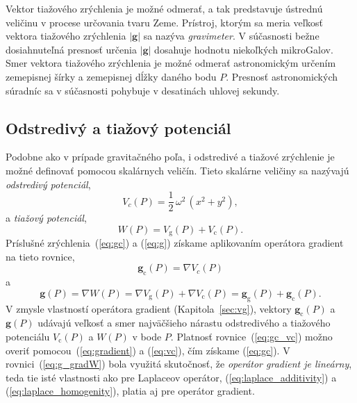 \documentclass[a4paper, 12pt]{book}
\newcommand{\gidx}{\mathrm g}
\newcommand{\cidx}{\mathrm c}
\let\vec\mathbf
\begin{document}
Vektor tiažového zrýchlenia je možné odmerať, a tak predstavuje ústrednú 
veličinu v procese určovania tvaru Zeme.  Prístroj, ktorým sa meria veľkosť 
vektora tiažového zrýchlenia $| \vec g |$ sa nazýva \emph{gravimeter}.  
V súčasnosti bežne dosiahnuteľná presnosť určenia $| \vec g |$ dosahuje hodnotu 
niekoľkých mikroGalov.  Smer vektora tiažového zrýchlenia je možné odmerať 
astronomickým určením zemepisnej šírky a zemepisnej dĺžky daného bodu $P$.  
Presnosť astronomických súradníc sa v súčasnosti pohybuje v desatinách uhlovej 
sekundy.






\subsection{Odstredivý a tiažový potenciál}

Podobne ako v prípade gravitačného poľa, i odstredivé a tiažové zrýchlenie je 
možné definovať pomocou skalárnych veličín.  Tieto skalárne veličiny sa 
nazývajú \emph{odstredivý potenciál},
%
\begin{equation}
\label{eq:vc}
V_c(P) = \frac{1}{2} \, \omega^2 \, (x^2 + y^2){,}
\end{equation}
%
a \emph{tiažový potenciál},
%
\begin{equation}
W(P) = V_\gidx(P) + V_\cidx(P){.}
\end{equation}
%
Príslušné zrýchlenia~(\ref{eq:gc}) a (\ref{eq:g}) získame aplikovaním operátora 
gradient na tieto rovnice,
%
\begin{equation}
\label{eq:gc_vc}
\vec g_\cidx(P) = \nabla V_c(P)
\end{equation}
%
a
%
\begin{equation}
\label{eq:g_gradW}
\vec g(P) = \nabla W(P) = \nabla V_\gidx(P) + \nabla V_\cidx(P) = \vec 
g_\gidx(P) + \vec g_\cidx(P){.}
\end{equation}
%
V zmysle vlastností operátora gradient (Kapitola~\ref{sec:vg}), vektory $\vec 
g_\cidx(P)$ a $\vec g(P)$ udávajú veľkosť a smer najväčšieho nárastu 
odstredivého a tiažového potenciálu $V_\cidx(P)$ a $W(P)$ v bode $P$.  Platnosť 
rovnice~(\ref{eq:gc_vc}) možno overiť pomocou~(\ref{eq:gradient}) 
a (\ref{eq:vc}), čím získame (\ref{eq:gc}).  V rovnici~(\ref{eq:g_gradW}) bola 
využitá skutočnosť, že \emph{operátor gradient je lineárny}, teda tie isté 
vlastnosti ako pre Laplaceov operátor, (\ref{eq:laplace_additivity}) 
a (\ref{eq:laplace_homogenity}), platia aj pre operátor gradient.
\end{document}
